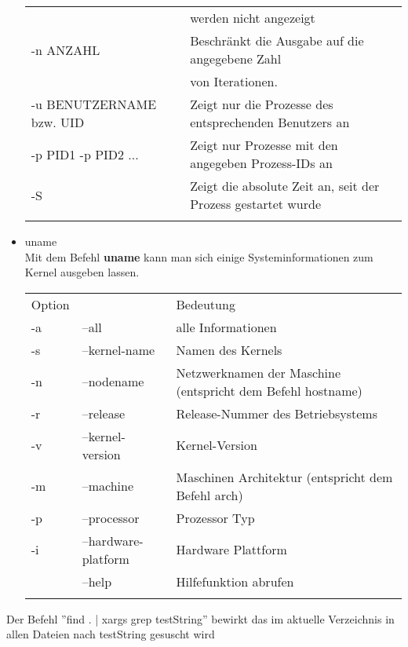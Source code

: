 \begin{itemize}
\begin{tabular}{ll}
				& werden nicht angezeigt\\
				-n ANZAHL & Beschr\"ankt die Ausgabe auf die angegebene Zahl\\
				& von Iterationen.\\
				-u BENUTZERNAME bzw. UID & Zeigt nur die Prozesse des entsprechenden Benutzers an\\
				-p PID1 -p PID2 ... & Zeigt nur Prozesse mit den angegeben Prozess-IDs an\\
				-S & Zeigt die absolute Zeit an, seit der Prozess gestartet wurde\\ \\
			\end{tabular}
			\item uname\\
			Mit dem Befehl \textbf{uname} kann man sich einige Systeminformationen zum Kernel ausgeben lassen.\\
			\begin{tabular}{lll}
				Option & & Bedeutung \\
				-a & --all & alle Informationen\\
				-s & --kernel-name & Namen des Kernels\\
				-n & --nodename &  Netzwerknamen der Maschine (entspricht dem Befehl hostname)\\
				-r & --release & Release-Nummer des Betriebsystems\\
				-v & --kernel-version & Kernel-Version\\
				-m & --machine & Maschinen Architektur (entspricht dem Befehl arch)\\
				-p & --processor & Prozessor Typ\\
				-i & --hardware-platform & Hardware Plattform\\
				& --help & Hilfefunktion abrufen\\ \\
			\end{tabular}
		\end{itemize}
		Der Befehl ''find . | xargs grep testString'' bewirkt das im aktuelle Verzeichnis in allen Dateien nach testString gesuscht wird
